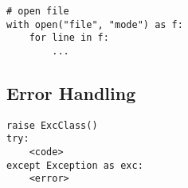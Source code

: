 \begin{verbatim}
# open file
with open("file", "mode") as f:
    for line in f:
        ...
\end{verbatim}







\subsection{Error Handling}

\begin{verbatim}
raise ExcClass()
try:
    <code>
except Exception as exc:
    <error>
\end{verbatim}




